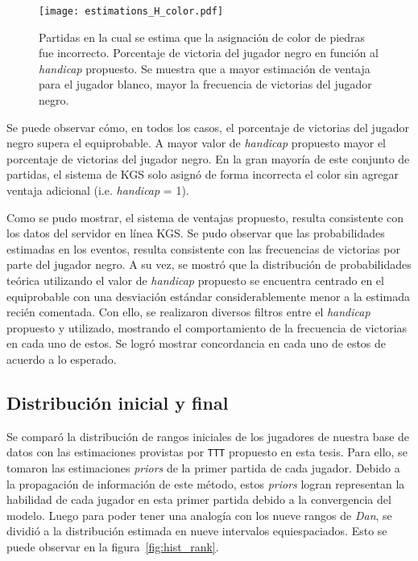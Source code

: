 \documentclass[11pt,twoside,spanish]{report} %
\begin{document}
\begin{figure}[H]
    \centering
    \texttt{[image: estimations\_H\_color.pdf]}
    \caption{Partidas en la cual se estima que la asignaci\'on de color de piedras fue incorrecto. Porcentaje de victoria del jugador negro en funci\'on al \textit{handicap} propuesto.  Se muestra que a mayor estimaci\'on de ventaja para el jugador blanco,  mayor la frecuencia de victorias del jugador negro.}
    \label{fig:estimations_H_color}
\end{figure}

Se puede observar c\'omo, en todos los casos, el porcentaje de victorias del jugador negro supera el equiprobable. 
A mayor valor de \textit{handicap} propuesto mayor el porcentaje de victorias del jugador negro.
En la gran mayor\'ia de este conjunto de partidas, el sistema de KGS solo asign\'o de forma incorrecta el color sin agregar ventaja adicional (i.e. \textit{handicap} = 1).

Como se pudo mostrar, el sistema de ventajas propuesto, resulta consistente con los datos del servidor en l\'inea KGS.
Se pudo observar que las probabilidades estimadas en los eventos, resulta consistente con las frecuencias de victorias por parte del jugador negro.
A su vez, se mostr\'o que la distribuci\'on de probabilidades te\'orica utilizando el valor de \textit{handicap} propuesto se encuentra centrado en el equiprobable con una desviaci\'on est\'andar considerablemente menor a la estimada reci\'en comentada.
Con ello, se realizaron diversos filtros entre el \textit{handicap} propuesto y utilizado, mostrando el comportamiento de la frecuencia de victorias en cada uno de estos.
Se logr\'o mostrar concordancia en cada uno de estos de acuerdo a lo esperado.







\vspace{7cm}
\subsection{Distribuci\'on inicial y final}

Se compar\'o la distribuci\'on de rangos iniciales de los jugadores de nuestra base de datos con las estimaciones provistas por \texttt{TTT} propuesto en esta tesis.
Para ello, se tomaron las estimaciones  \textit{priors} de la primer partida de cada jugador.
Debido a la propagaci\'on de informaci\'on de este m\'etodo, estos \textit{priors} logran representan la habilidad de cada jugador en esta primer partida debido a la convergencia del modelo.
Luego para poder tener una analog\'ia con los nueve rangos de \textit{Dan}, se dividi\'o a la distribuci\'on estimada en nueve intervalos equiespaciados.
Esto se puede observar en la figura~\ref{fig:hist_rank}.
\end{document}
